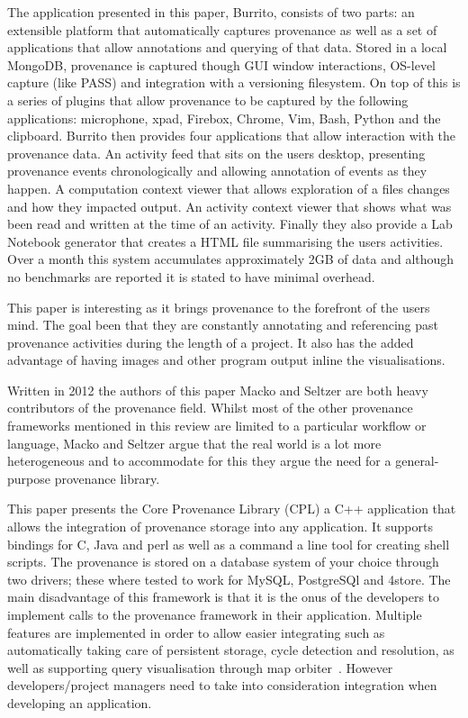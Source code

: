 The application presented in this paper, Burrito, consists of two parts: an extensible platform that automatically captures provenance as well as a set of applications that allow annotations and querying of that data. Stored in a local MongoDB, provenance is captured though GUI window interactions, OS-level capture (like PASS\cite{Muniswamy2006}) and integration with a versioning filesystem. On top of this is a series of plugins that allow provenance to be captured by the following applications: microphone, xpad, Firebox, Chrome, Vim, Bash, Python and the clipboard. Burrito then provides four applications that allow interaction with the provenance data. An activity feed that sits on the users desktop, presenting provenance events chronologically and allowing annotation of events as they happen. A computation context viewer that allows exploration of a files changes and how they impacted output. An activity context viewer that shows what was been read and written at the time of an activity. Finally they also provide a Lab Notebook generator that creates a HTML file summarising the users activities. Over a month this system accumulates approximately 2GB of data and although no benchmarks are reported it is stated to have minimal overhead.

This paper is interesting as it brings provenance to the forefront of the users mind. The goal been that they are constantly annotating and referencing past provenance activities during the length of a project. It also has the added advantage of having images and other program output inline the visualisations.


Written in 2012 the authors of this paper Macko and Seltzer are both heavy contributors of the provenance field. Whilst most of the other provenance frameworks mentioned in this review are limited to a particular workflow or language, Macko and Seltzer argue that the real world is a lot more heterogeneous and to accommodate for this they argue the need for a general-purpose provenance library.

This paper presents the Core Provenance Library (CPL) a C++ application that allows the integration of provenance storage into any application. It supports bindings for C, Java and perl as well as a command a line tool for creating shell scripts. The provenance is stored on a database system of your choice through two drivers; these where tested to work for MySQL, PostgreSQl and 4store. The main disadvantage of this framework is that it is the onus of the developers to implement calls to the provenance framework in their application. Multiple features are implemented in order to allow easier integrating such as automatically taking care of persistent storage, cycle detection and resolution, as well as supporting query visualisation through map orbiter~\cite{Seltzer2011}. However developers/project managers need to take into consideration integration when developing an application.

